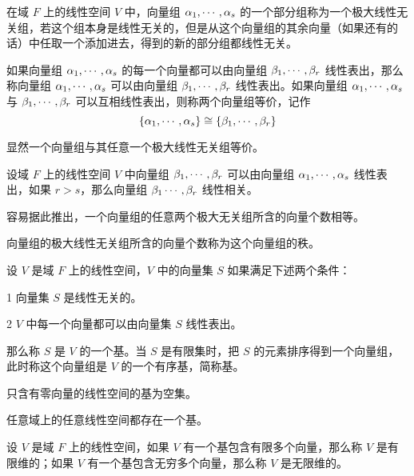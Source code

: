 \begin{definition}
    在域 $F$ 上的线性空间 $V$ 中，向量组 $\alpha_1,\cdots,\alpha_s$ 的一个部分组称为一个极大线性无关组，若这个组本身是线性无关的，但是从这个向量组的其余向量（如果还有的话）中任取一个添加进去，得到的新的部分组都线性无关。
\end{definition}

\begin{definition}
    如果向量组 $\alpha_1,\cdots,\alpha_s$ 的每一个向量都可以由向量组 $\beta_1,\cdots,\beta_r$ 线性表出，那么称向量组 $\alpha_1,\cdots,\alpha_s$ 可以由向量组 $\beta_1,\cdots,\beta_r$ 线性表出。如果向量组 $\alpha_1,\cdots,\alpha_s$ 与 $\beta_1,\cdots,\beta_r$ 可以互相线性表出，则称两个向量组等价，记作
    \[ \{ \alpha_1, \cdots,\alpha_s \} \cong \{\beta_1,\cdots,\beta_r\}\]
\end{definition}

显然一个向量组与其任意一个极大线性无关组等价。

\begin{theorem}
    设域 $F$ 上的线性空间 $V$ 中向量组 $\beta_1,\cdots,\beta_r$ 可以由向量组 $\alpha_1,\cdots,\alpha_s$ 线性表出，如果 $r>s$，那么向量组 $\beta_1\cdots,\beta_r$ 线性相关。
\end{theorem}

容易据此推出，一个向量组的任意两个极大无关组所含的向量个数相等。

\begin{definition}
    向量组的极大线性无关组所含的向量个数称为这个向量组的秩。
\end{definition}

\begin{definition}
    设 $V$ 是域 $F$ 上的线性空间，$V$ 中的向量集 $S$ 如果满足下述两个条件：

    \num{1} 向量集 $S$ 是线性无关的。

    \num{2} $V$ 中每一个向量都可以由向量集 $S$ 线性表出。

    那么称 $S$ 是 $V$ 的一个基。当 $S$ 是有限集时，把 $S$ 的元素排序得到一个向量组，此时称这个向量组是 $V$ 的一个有序基，简称基。
\end{definition}

只含有零向量的线性空间的基为空集。

\begin{theorem}
    任意域上的任意线性空间都存在一个基。
\end{theorem}

\begin{definition}
    设 $V$ 是域 $F$ 上的线性空间，如果 $V$ 有一个基包含有限多个向量，那么称 $V$ 是有限维的；如果 $V$ 有一个基包含无穷多个向量，那么称 $V$ 是无限维的。
\end{definition}

